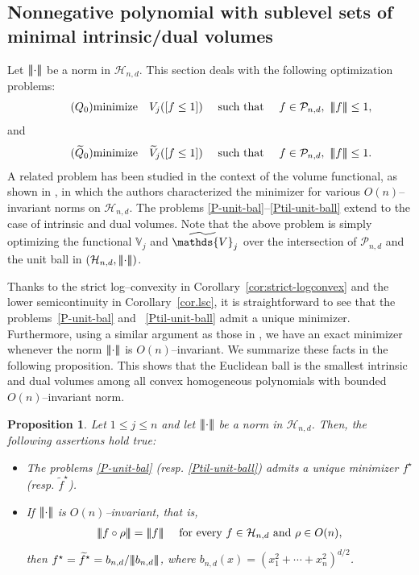 \documentclass[11pt]{article}
\newtheorem{proposition}[theorem]{Proposition}
\theoremstyle{definition}
\numberwithin{equation}{section}
\newcommand{\cH}{\mathcal{H}}        %
\newcommand{\cP}{\mathcal{P}}        %
\newcommand{\opV}{\mathds{V}}       %
\DeclarePairedDelimiter{\tnorm}{\lvert\!\lvert\!\lvert}{\rvert\!\rvert\!\rvert}
\begin{document}
\subsection{Nonnegative polynomial with sublevel sets of minimal intrinsic/dual volumes}
Let $\tnorm{\cdot}$ be a norm in $\cH_{n, d}$.
This section deals with the following optimization problems:
\begin{equation}\label{P-unit-bal}\tag{$Q_0$}
	\text{minimize} \quad V_j([f \leq 1]) \quad \text{ such that } \quad f \in \cP_{n, d}, \,\, \tnorm{f} \leq 1,
\end{equation}
and
\begin{equation}\label{Ptil-unit-ball}\tag{$\widetilde Q_0$}
	\text{minimize} \quad \widetilde V_j([f \leq 1]) \quad \text{ such that } \quad f \in \cP_{n, d}, \,\, \tnorm{f} \leq 1.
\end{equation}
A related problem has been studied in the context of the volume functional, as shown in \cite{KL_2022}, in which the authors characterized the minimizer for various $O(n)$–invariant norms on $\cH_{n, d}$.
The problems \eqref{P-unit-bal}--\eqref{Ptil-unit-ball} extend to the case of intrinsic and dual volumes.
Note that the above problem is simply optimizing the functional $\opV_j$ and $\widetilde \opV_j$ over the intersection of $\cP_{n, d}$ and the unit ball in $(\cH_{n, d}, \tnorm{\cdot})$.

\medskip

Thanks to the strict log--convexity in Corollary~\ref{cor:strict-logconvex} and the lower semicontinuity in Corollary~\ref{cor.lsc}, it is straightforward to see that the problems~\eqref{P-unit-bal} and ~\eqref{Ptil-unit-ball} admit a unique minimizer. 
Furthermore, using a similar argument as those in \cite[Theorem 1.2]{KL_2022}, we have an exact minimizer whenever the norm $\tnorm{\cdot}$ is $O(n)$--invariant. 
We summarize these facts in the following proposition.
This shows that the Euclidean ball is the smallest intrinsic and dual volumes among all convex homogeneous polynomials with bounded $O(n)$--invariant norm.

\begin{proposition}
Let $1 \leq j \leq n$ and let $\tnorm{\cdot}$ be a norm in $\cH_{n, d}$.
Then, the following assertions hold true:
\begin{itemize}
    \item[(i)] The problems \eqref{P-unit-bal} (resp. \eqref{Ptil-unit-ball}) admits a unique minimizer $f^\star$ (resp. $\widetilde f^\star$).
    \item[(ii)] If $\tnorm{\cdot}$ is $O(n)$--invariant, that is,
    \begin{align*}
        \tnorm{f \circ \rho} = \tnorm{f} \quad \text{ for every } f \in \cH_{n, d} \text{ and } \rho \in O(n),
    \end{align*}
    then $f^\star = \widetilde f^\star = b_{n, d}/\tnorm{b_{n, d}}$, where $b_{n, d}(x) = (x_1^2 + \cdots + x_n^2)^{d/2}$.
    \end{itemize}
\end{proposition}
\end{document}
